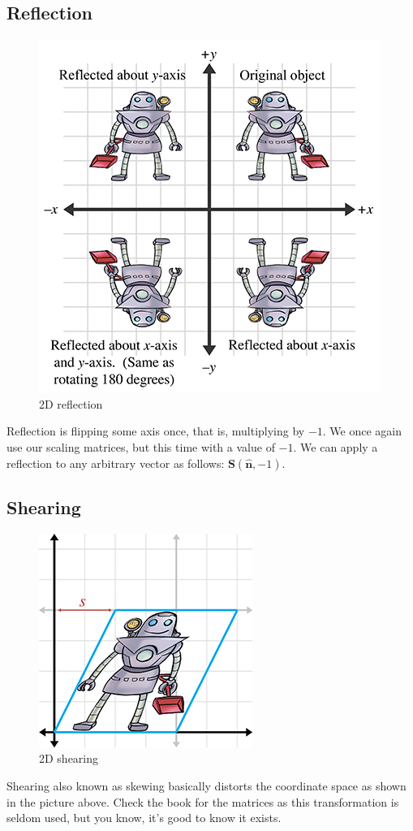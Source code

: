 \documentclass[11pt]{article}
\begin{document}
\subsection{Reflection}

\begin{figure}[H]
\centering
    \includegraphics{05_reflection}
\caption{2D reflection}
\label{fig:2d-reflection}
\end{figure}

Reflection is flipping some axis once, that is, multiplying by $-1$. We once again use our scaling matrices, but this time with a value of $-1$. We can apply a reflection to any arbitrary vector as follows: $\mathbf{S}(\hat{\mathbf{n}},-1)$.

\subsection{Shearing}

\begin{figure}[H]
\centering
    \includegraphics{05_shearing}
\caption{2D shearing}
\label{fig:2d-shearing}
\end{figure}

Shearing also known as skewing basically distorts the coordinate space as shown in the picture above. Check the book for the matrices as this transformation is seldom used, but you know, it's good to know it exists.
\end{document}

